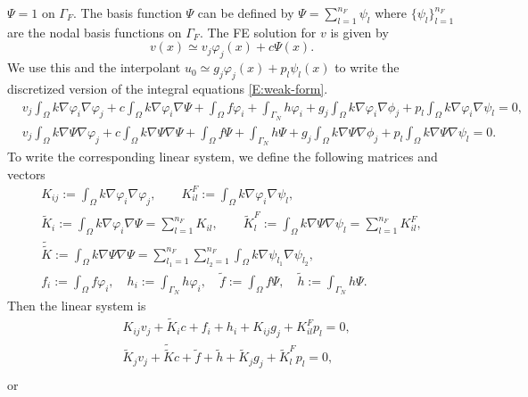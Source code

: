 \documentclass[10pt,a4paper]{article}
\begin{document}
$\Psi=1$ on $\Gamma_F$. The basis function $\Psi$ can be
defined by $\Psi = \sum^{n_F}_{l=1} \psi_l$ where 
$\{\psi_l\}^{n_F}_{l=1}$ are the nodal basis functions
on $\Gamma_F$. The FE solution for $v$ is given by
\[
v(x) \simeq v_j \varphi_j(x) + c \Psi(x).
\]
We use this and the interpolant 
$u_0 \simeq g_j \varphi_j(x) + p_l \psi_l(x)$
to write the discretized version of the integral equations
\eqref{E:weak-form}.
%
\begin{align*}
&v_j \int_\Omega k\nabla\varphi_i \nabla\varphi_j 
+ c \int_\Omega k\nabla\varphi_i \nabla\Psi
+ \int_\Omega f\varphi_i + \int_{\Gamma_N} h\varphi_i 
+ g_j \int_\Omega k\nabla\varphi_i \nabla\phi_j
+ p_l \int_\Omega k\nabla\varphi_i \nabla\psi_l = 0, 
\\
&v_j \int_\Omega k\nabla\Psi \nabla\varphi_j 
+ c \int_\Omega k\nabla\Psi \nabla\Psi
+ \int_\Omega f\Psi + \int_{\Gamma_N} h\Psi 
+ g_j \int_\Omega k\nabla\Psi \nabla\phi_j
+ p_l \int_\Omega k\nabla\Psi \nabla\psi_l = 0.
\end{align*}
%
To write the corresponding linear system, we define the following 
matrices and vectors
%
\begin{equation*}
\begin{gathered}
K_{ij} := \int_\Omega k\nabla\varphi_i\nabla\varphi_j, \qquad
K^F_{il} := \int_\Omega k\nabla\varphi_i\nabla\psi_l, \\
\widetilde{K}_{i} := \int_\Omega k\nabla\varphi_i\nabla\Psi
= \sum^{n_F}_{l=1} K_{il} , \qquad
\widetilde{K}^F_{l} := \int_\Omega k\nabla\Psi\nabla\psi_l
= \sum^{n_F}_{l=1} K^F_{il}, \\
\widetilde{\widetilde{K}} := \int_\Omega k\nabla\Psi\nabla\Psi 
= \sum^{n_F}_{l_1=1}\sum^{n_F}_{l_2=1} \int_\Omega k\nabla\psi_{l_1}\nabla\psi_{l_2},\\
f_i := \int_\Omega f\varphi_i, \quad h_i := \int_{\Gamma_N} h\varphi_i,
\quad \widetilde{f} := \int_\Omega f\Psi, 
\quad \widetilde{h} :=\int_{\Gamma_N} h\Psi.
\end{gathered}
\end{equation*}
%
Then the linear system is
%
\begin{align*}
&K_{ij} v_j + \widetilde{K}_i c + f_i + h_i + K_{ij} g_j + K^F_{il} p_l = 0, \\
&\widetilde{K}_j v_j + \widetilde{\widetilde{K}} c + \widetilde{f} + \widetilde{h} + \widetilde{K}_j g_j + \widetilde{K}^F_l p_l = 0, \\
\end{align*}
%
or
\end{document}
